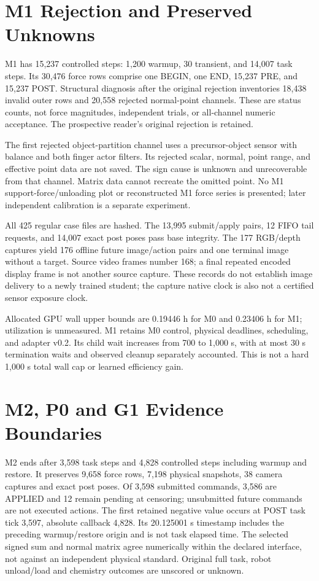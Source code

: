 \documentclass{article}
\begin{document}
\section{M1 Rejection and Preserved Unknowns}
M1 has 15,237 controlled steps: 1,200 warmup, 30 transient, and 14,007 task steps. Its 30,476 force rows comprise one BEGIN, one END, 15,237 PRE, and 15,237 POST. Structural diagnosis after the original rejection inventories 18,438 invalid outer rows and 20,558 rejected normal-point channels. These are status counts, not force magnitudes, independent trials, or all-channel numeric acceptance. The prospective reader's original rejection is retained.

The first rejected object-partition channel uses a precursor-object sensor with balance and both finger actor filters. Its rejected scalar, normal, point range, and effective point data are not saved. The sign cause is unknown and unrecoverable from that channel. Matrix data cannot recreate the omitted point. No M1 support-force/unloading plot or reconstructed M1 force series is presented; later independent calibration is a separate experiment.

All 425 regular case files are hashed. The 13,995 submit/apply pairs, 12 FIFO tail requests, and 14,007 exact post poses pass base integrity. The 177 RGB/depth captures yield 176 offline future image/action pairs and one terminal image without a target. Source video frames number 168; a final repeated encoded display frame is not another source capture. These records do not establish image delivery to a newly trained student; the capture native clock is also not a certified sensor exposure clock.

Allocated GPU wall upper bounds are 0.19446 h for M0 and 0.23406 h for M1; utilization is unmeasured. M1 retains M0 control, physical deadlines, scheduling, and adapter v0.2. Its child wait increases from 700 to 1,000 s, with at most 30 s termination waits and observed cleanup separately accounted. This is not a hard 1,000 s total wall cap or learned efficiency gain.


\section{M2, P0 and G1 Evidence Boundaries}
M2 ends after 3,598 task steps and 4,828 controlled steps including warmup and restore. It preserves 9,658 force rows, 7,198 physical snapshots, 38 camera captures and exact post poses. Of 3,598 submitted commands, 3,586 are APPLIED and 12 remain pending at censoring; unsubmitted future commands are not executed actions. The first retained negative value occurs at POST task tick 3,597, absolute callback 4,828. Its 20.125001 s timestamp includes the preceding warmup/restore origin and is not task elapsed time. The selected signed sum and normal matrix agree numerically within the declared interface, not against an independent physical standard. Original full task, robot unload/load and chemistry outcomes are unscored or unknown.
\end{document}
